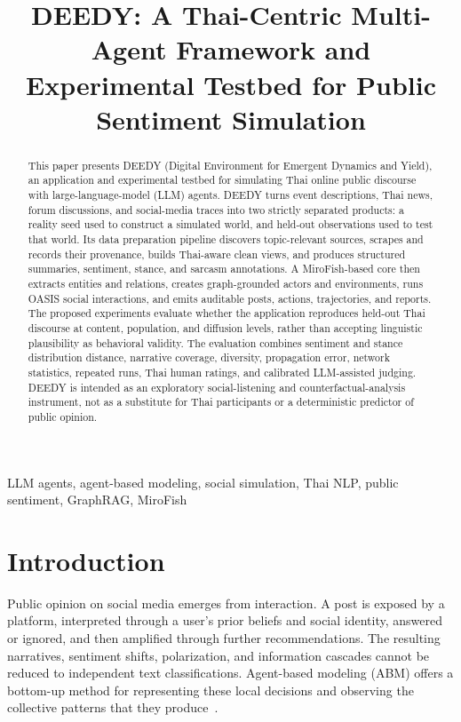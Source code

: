 \documentclass[conference]{IEEEtran}
\title{DEEDY: A Thai-Centric Multi-Agent Framework and\\
Experimental Testbed for Public Sentiment Simulation}
\author{\IEEEauthorblockN{Sawit Koseeyaumporn}
\IEEEauthorblockA{Department of Computer Engineering\\
King Mongkut's University of Technology Thonburi, Bangkok, Thailand\\
\texttt{sawit.kosee@kmutt.ac.th}}}
\begin{document}
\maketitle

\begin{abstract}
This paper presents DEEDY (Digital Environment for Emergent Dynamics and
Yield), an application and experimental testbed for simulating Thai online
public discourse with large-language-model (LLM) agents. DEEDY turns event
descriptions, Thai news, forum discussions, and social-media traces into two
strictly separated products: a reality seed used to construct a simulated
world, and held-out observations used to test that world. Its data preparation
pipeline discovers topic-relevant sources, scrapes and records their
provenance, builds Thai-aware clean views, and produces structured summaries,
sentiment, stance, and sarcasm annotations. A MiroFish-based core then extracts
entities and relations, creates graph-grounded actors and environments, runs
OASIS social interactions, and emits auditable posts, actions, trajectories,
and reports. The proposed experiments evaluate whether the application
reproduces held-out Thai discourse at content, population, and diffusion
levels, rather than accepting linguistic plausibility as behavioral validity.
The evaluation combines sentiment and stance distribution distance, narrative
coverage, diversity, propagation error, network statistics, repeated runs,
Thai human ratings, and calibrated LLM-assisted judging. DEEDY is intended as
an exploratory social-listening and counterfactual-analysis instrument, not as
a substitute for Thai participants or a deterministic predictor of public
opinion.
\end{abstract}

\begin{IEEEkeywords}
LLM agents, agent-based modeling, social simulation, Thai NLP, public
sentiment, GraphRAG, MiroFish
\end{IEEEkeywords}

\section{Introduction}

Public opinion on social media emerges from interaction. A post is exposed by
a platform, interpreted through a user's prior beliefs and social identity,
answered or ignored, and then amplified through further recommendations. The
resulting narratives, sentiment shifts, polarization, and information cascades
cannot be reduced to independent text classifications. Agent-based modeling
(ABM) offers a bottom-up method for representing these local decisions and
observing the collective patterns that they produce~\cite{macal2010tutorial}.
\end{document}
